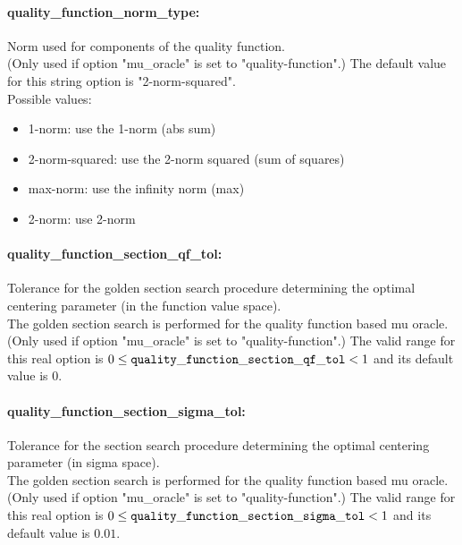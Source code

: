 \paragraph{quality\_function\_norm\_type:}\label{sec:quality_function_norm_type} Norm used for components of the quality function. $\;$ \\
 (Only used if option "mu\_oracle" is set to
"quality-function".)
The default value for this string option is "2-norm-squared".
\\ 
Possible values:
\begin{itemize}
   \item 1-norm: use the 1-norm (abs sum)
   \item 2-norm-squared: use the 2-norm squared (sum of squares)
   \item max-norm: use the infinity norm (max)
   \item 2-norm: use 2-norm
\end{itemize}

\paragraph{quality\_function\_section\_qf\_tol:}\label{sec:quality_function_section_qf_tol} Tolerance for the golden section search procedure determining the optimal centering parameter (in the function value space). $\;$ \\
 The golden section search is performed for the
quality function based mu oracle. (Only used if
option "mu\_oracle" is set to "quality-function".) The valid range for this real option is 
$0 \le {\tt quality\_function\_section\_qf\_tol } <  1$
and its default value is $0$.


\paragraph{quality\_function\_section\_sigma\_tol:}\label{sec:quality_function_section_sigma_tol} Tolerance for the section search procedure determining the optimal centering parameter (in sigma space). $\;$ \\
 The golden section search is performed for the
quality function based mu oracle. (Only used if
option "mu\_oracle" is set to "quality-function".) The valid range for this real option is 
$0 \le {\tt quality\_function\_section\_sigma\_tol } <  1$
and its default value is $0.01$.


